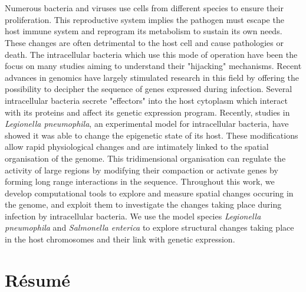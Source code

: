 %
\chapter*{\abstractname}
\label{sec:abstract}
\vspace*{-10mm}

Numerous bacteria and viruses use cells from different species to ensure their proliferation. This reproductive system implies the pathogen must escape the host immune system and reprogram its metabolism to sustain its own needs. These changes are often detrimental to the host cell and cause pathologies or death. The intracellular bacteria which use this mode of operation have been the focus on many studies aiming to understand their "hijacking" mechanisms. Recent advances in genomics have largely stimulated research in this field by offering the possibility to decipher the sequence of genes expressed during infection. Several intracellular bacteria secrete "effectors" into the host cytoplasm which interact with its proteins and affect its genetic expression program. Recently, studies in \textit{Legionella pneumophila}, an experimental model for intracellular bacteria, have showed it was able to change the epigenetic state of its host. These modifications allow rapid physiological changes and are intimately linked to the spatial organisation of the genome. This tridimensional organisation can regulate the activity of large regions by modifying their compaction or activate genes by forming long range interactions in the sequence. Throughout this work, we develop computational tools to explore and measure spatial changes occuring in the genome, and exploit them to investigate the changes taking place during infection by intracellular bacteria. We use the model species \textit{Legionella pneumophila} and \textit{Salmonella enterica} to explore structural changes taking place in the host chromosomes and their link with genetic expression.

\vspace*{20mm}

\chapter*{Résumé}
\label{sec:abstract-diff}


